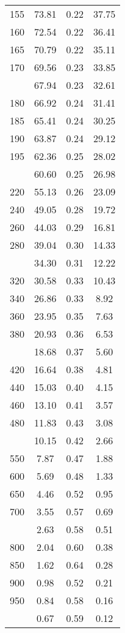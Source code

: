 \begin{table}[ht]
\begin{tabular}{lccc}
  155 & 73.81 & 0.22 & 37.75 \\ 
  160 & 72.54 & 0.22 & 36.41 \\ 
  165 & 70.79 & 0.22 & 35.11 \\ 
  170 & 69.56 & 0.23 & 33.85 \\ 
   \addlinespace
175 & 67.94 & 0.23 & 32.61 \\ 
  180 & 66.92 & 0.24 & 31.41 \\ 
  185 & 65.41 & 0.24 & 30.25 \\ 
  190 & 63.87 & 0.24 & 29.12 \\ 
  195 & 62.36 & 0.25 & 28.02 \\ 
   \addlinespace
200 & 60.60 & 0.25 & 26.98 \\ 
  220 & 55.13 & 0.26 & 23.09 \\ 
  240 & 49.05 & 0.28 & 19.72 \\ 
  260 & 44.03 & 0.29 & 16.81 \\ 
  280 & 39.04 & 0.30 & 14.33 \\ 
   \addlinespace
300 & 34.30 & 0.31 & 12.22 \\ 
  320 & 30.58 & 0.33 & 10.43 \\ 
  340 & 26.86 & 0.33 & 8.92 \\ 
  360 & 23.95 & 0.35 & 7.63 \\ 
  380 & 20.93 & 0.36 & 6.53 \\ 
   \addlinespace
400 & 18.68 & 0.37 & 5.60 \\ 
  420 & 16.64 & 0.38 & 4.81 \\ 
  440 & 15.03 & 0.40 & 4.15 \\ 
  460 & 13.10 & 0.41 & 3.57 \\ 
  480 & 11.83 & 0.43 & 3.08 \\ 
   \addlinespace
500 & 10.15 & 0.42 & 2.66 \\ 
  550 & 7.87 & 0.47 & 1.88 \\ 
  600 & 5.69 & 0.48 & 1.33 \\ 
  650 & 4.46 & 0.52 & 0.95 \\ 
  700 & 3.55 & 0.57 & 0.69 \\ 
   \addlinespace
750 & 2.63 & 0.58 & 0.51 \\ 
  800 & 2.04 & 0.60 & 0.38 \\ 
  850 & 1.62 & 0.64 & 0.28 \\ 
  900 & 0.98 & 0.52 & 0.21 \\ 
  950 & 0.84 & 0.58 & 0.16 \\ 
   \addlinespace
1000 & 0.67 & 0.59 & 0.12 \\ 
   \bottomrule
\end{tabular}
\end{table}
